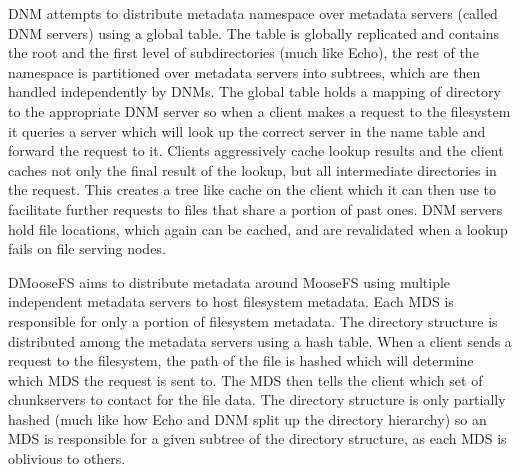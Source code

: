 DNM \cite{Wei2000} attempts to distribute metadata namespace over metadata
servers (called DNM servers) using a global table. The table is globally
replicated and contains the root and the first level of subdirectories (much
like Echo), the rest of the namespace is partitioned over metadata servers
into subtrees, which are then handled independently by DNMs. The global table
holds a mapping of directory to the appropriate DNM server so when a client
makes a request to the filesystem it queries a server which will look up the
correct server in the name table and forward the request to it. Clients
aggressively cache lookup results and the client caches not only the final
result of the lookup, but all intermediate directories in the request. This
creates a tree like cache on the client which it can then use to facilitate
further requests to files that share a portion of past ones. DNM servers hold
file locations, which again can be cached, and are revalidated when a lookup
fails on file serving nodes.


DMooseFS \cite{Yu2012} aims to distribute metadata around MooseFS using
multiple independent metadata servers to host filesystem metadata. Each MDS is
responsible for only a portion of filesystem metadata. The directory structure
is distributed among the metadata servers using a hash table. When a client
sends a request to the filesystem, the path of the file is hashed which will
determine which MDS the request is sent to. The MDS then tells the client
which set of chunkservers to contact for the file data. The directory
structure is only partially hashed (much like how Echo and DNM split up the
directory hierarchy) so an MDS is responsible for a given subtree of the
directory structure, as each MDS is oblivious to others.


